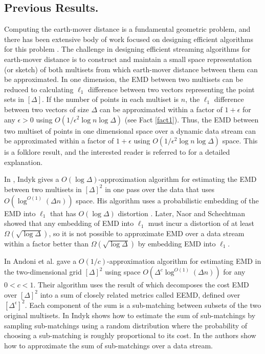 \documentclass[oribibl]{llncs}
\begin{document}
\subsection{Previous Results.}
Computing the earth-mover distance is a fundamental geometric problem, and
there has been extensive body of work focused on designing efficient algorithms
for this problem \cite{lawler, vai89, charikar, thaper, av04, eps_matching}.
The challenge in designing efficient streaming algorithms for earth-mover
distance is to construct and maintain a small space representation (or sketch)
of both multisets from which earth-mover distance between them can be
approximated.  In one dimension, the EMD between two multisets
can be reduced to calculating $\ell_1$ difference between two vectors
representing the point sets in $[\Delta]$. If the number of points in each
multiset is $n$, the $\ell_1$ difference between two vectors of size $\Delta$
can be approximated within a factor of $1+\epsilon$ for any $\epsilon>0$ using
$O(1/\epsilon^2\log n\log\Delta)$ (see Fact \ref{fact1}). Thus, the EMD between
two multiset of points in one dimensional space over a dynamic data stream can
be approximated within a factor of $1+\epsilon$ using
$O(1/\epsilon^2\log n\log\Delta)$ space.
This is a folklore result, and the interested reader is referred to
\cite{emdgraphmetrics} for a detailed explanation.

In \cite{ind04}, Indyk gives a $O(\log\Delta)$-approximation
algorithm for estimating the EMD between two multisets in $[\Delta]^2$ in one
pass over the data that uses $O(\log^{O(1)}(\Delta n))$ space.
His algorithm uses a probabilistic embedding of the EMD into $\ell_1$ that
has $O(\log\Delta)$ distortion \cite{thaper, charikar}.
Later, Naor and Schechtman \cite{naor} showed that any embedding of EMD into
$\ell_1$ must incur a distortion of at least $\Omega(\sqrt{\log\Delta})$, so 
it is not possible to approximate EMD over a data stream within a factor better
than $\Omega(\sqrt{\log\Delta})$ by embedding EMD into $\ell_1$. 

In \cite{const-approx} Andoni et al. gave a $O(1/c)$-approximation
algorithm for estimating EMD in the two-dimensional grid $[\Delta]^2$ using space
$O(\Delta^c\log^{O(1)}(\Delta n))$ for any $0<c<1$. 
Their algorithm uses the result of \cite{ind07}
which decomposes the cost EMD over $[\Delta]^2$ into a sum of closely related
metrics called EEMD, defined over $[\Delta^\epsilon]^2$. Each component of the
sum is a sub-matching between subsets of the two original multisets. 
In \cite{ind07} Indyk shows how to estimate the sum of sub-matchings by sampling
sub-matchings using a random distribution where the probability of choosing a
sub-matching is roughly proportional to its cost. In \cite{const-approx} the
authors show how to approximate the sum of sub-matchings over a data stream.
\end{document}
